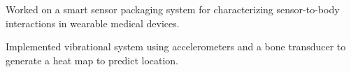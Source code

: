 \documentclass[]{deedy-resume-openfont}
\begin{document}
\begin{minipage}[t]{0.66\textwidth}
\sectionsep

\begin{tightemize}
\item Worked on a smart sensor packaging system for characterizing sensor-to-body interactions in wearable medical devices. 
\item Implemented vibrational system using accelerometers and a bone transducer to generate a heat map to predict location. 
\end{tightemize}
\sectionsep






\end{minipage} 
\end{document}

